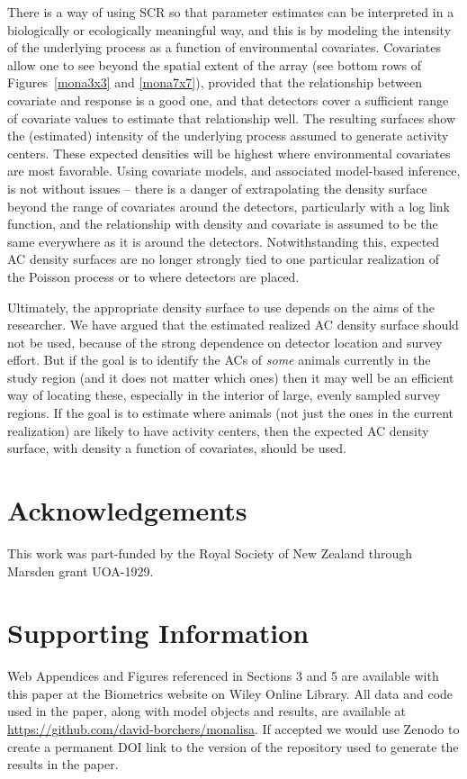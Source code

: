 \documentclass[useAMS,usenatbib,referee]{biom}
\begin{document}
There is a way of using SCR so that parameter estimates can be interpreted in a biologically or ecologically meaningful way, and this is by modeling the intensity of the underlying process as a function of environmental covariates. Covariates allow one to see beyond the spatial extent of the array (see bottom rows of Figures~\ref{mona3x3} and \ref{mona7x7}), provided that the relationship between covariate and response is a good one, and that detectors cover a sufficient range of covariate values to estimate that relationship well. The resulting surfaces show the (estimated) intensity of the underlying process assumed to generate activity centers. These expected densities will be highest where environmental covariates are most favorable. Using covariate models, and associated model-based inference, is not without issues -- there is a danger of extrapolating the density surface beyond the range of covariates around the detectors, particularly with a log link function, and the relationship with density and covariate is assumed to be the same everywhere as it is around the detectors. Notwithstanding this, expected AC density surfaces are no longer strongly tied to one particular realization of the Poisson process or to where detectors are placed.

Ultimately, the appropriate density surface to use depends on the aims of the researcher. We have argued that the estimated realized AC density surface should not be used, because of the strong dependence on detector location and survey effort. But if the goal is to identify the ACs of {\it some} animals currently in the study region (and it does not matter which ones) then it may well be an efficient way of locating these, especially in the interior of large, evenly sampled survey regions. If the goal is to estimate where animals (not just the ones in the current realization) are likely to have activity centers, then the expected AC density surface, with density a function of covariates, should be used.

\section*{Acknowledgements}

This work was part-funded by the Royal Society of New Zealand through Marsden grant UOA-1929.




\section*{Supporting Information}
Web Appendices and Figures referenced in Sections 3 and 5 are available with this paper at the Biometrics website on Wiley Online Library. All data and code used in the paper, along with model objects and results, are available at \url{https://github.com/david-borchers/monalisa}. If accepted we would use Zenodo to create a permanent DOI link to the version of the repository used to generate the results in the paper.
\end{document}
